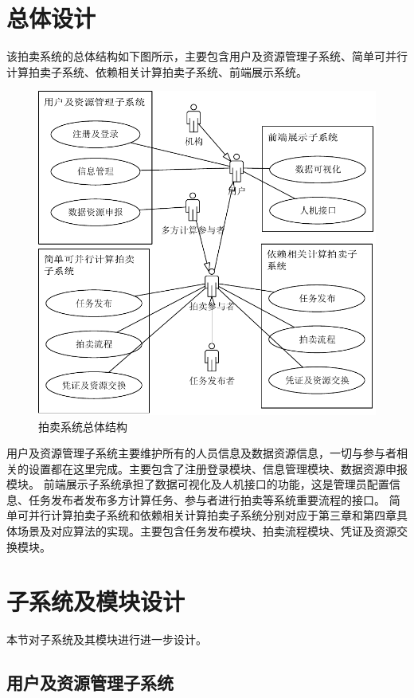 \documentclass[promaster]{thesis-uestc}
\begin{document}
\section{总体设计}
该拍卖系统的总体结构如下图所示，主要包含用户及资源管理子系统、简单可并行计算拍卖子系统、依赖相关计算拍卖子系统、前端展示系统。

\begin{figure}[H]
    \includegraphics[width=350pt]{pic/yongli.pdf}
    \caption{拍卖系统总体结构}
\end{figure}

用户及资源管理子系统主要维护所有的人员信息及数据资源信息，一切与参与者相关的设置都在这里完成。主要包含了注册登录模块、信息管理模块、数据资源申报模块。
前端展示子系统承担了数据可视化及人机接口的功能，这是管理员配置信息、任务发布者发布多方计算任务、参与者进行拍卖等系统重要流程的接口。
简单可并行计算拍卖子系统和依赖相关计算拍卖子系统分别对应于第三章和第四章具体场景及对应算法的实现。主要包含任务发布模块、拍卖流程模块、凭证及资源交换模块。

\section{子系统及模块设计}
本节对子系统及其模块进行进一步设计。

\subsection{用户及资源管理子系统}
\end{document}
